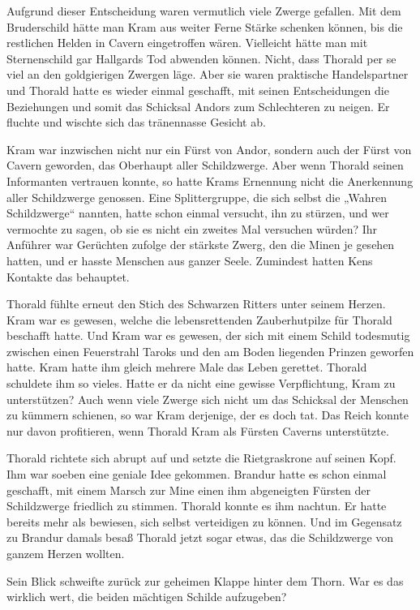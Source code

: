 Aufgrund dieser Entscheidung waren vermutlich viele Zwerge gefallen. Mit dem Bruderschild hätte man Kram aus weiter Ferne Stärke schenken können, bis die restlichen Helden in Cavern eingetroffen wären. Vielleicht hätte man mit Sternenschild gar Hallgards Tod abwenden können. Nicht, dass Thorald per se viel an den goldgierigen Zwergen läge. Aber sie waren praktische Handelspartner und Thorald hatte es wieder einmal geschafft, mit seinen Entscheidungen die Beziehungen und somit das Schicksal Andors zum Schlechteren zu neigen. Er fluchte und wischte sich das tränennasse Gesicht ab.

Kram war inzwischen nicht nur ein Fürst von Andor, sondern auch der Fürst von Cavern geworden, das Oberhaupt aller Schildzwerge. Aber wenn Thorald seinen Informanten vertrauen konnte, so hatte Krams Ernennung nicht die Anerkennung aller Schildzwerge genossen. Eine Splittergruppe, die sich selbst die „Wahren Schildzwerge“ nannten, hatte schon einmal versucht, ihn zu stürzen, und wer vermochte zu sagen, ob sie es nicht ein zweites Mal versuchen würden? Ihr Anführer war Gerüchten zufolge der stärkste Zwerg, den die Minen je gesehen hatten, und er hasste Menschen aus ganzer Seele. Zumindest hatten Kens Kontakte das behauptet.

Thorald fühlte erneut den Stich des Schwarzen Ritters unter seinem Herzen. Kram war es gewesen, welche die lebensrettenden Zauberhutpilze für Thorald beschafft hatte. Und Kram war es gewesen, der sich mit einem Schild todesmutig zwischen einen Feuerstrahl Taroks und den am Boden liegenden Prinzen geworfen hatte. Kram hatte ihm gleich mehrere Male das Leben gerettet. Thorald schuldete ihm so vieles. Hatte er da nicht eine gewisse Verpflichtung, Kram zu unterstützen? Auch wenn viele Zwerge sich nicht um das Schicksal der Menschen zu kümmern schienen, so war Kram derjenige, der es doch tat. Das Reich konnte nur davon profitieren, wenn Thorald Kram als Fürsten Caverns unterstützte.

Thorald richtete sich abrupt auf und setzte die Rietgraskrone auf seinen Kopf. Ihm war soeben eine geniale Idee gekommen. Brandur hatte es schon einmal geschafft, mit einem Marsch zur Mine einen ihm abgeneigten Fürsten der Schildzwerge friedlich zu stimmen. Thorald konnte es ihm nachtun. Er hatte bereits mehr als bewiesen, sich selbst verteidigen zu können. Und im Gegensatz zu Brandur damals besaß Thorald jetzt sogar etwas, das die Schildzwerge von ganzem Herzen wollten.

Sein Blick schweifte zurück zur geheimen Klappe hinter dem Thorn. War es das wirklich wert, die beiden mächtigen Schilde aufzugeben?

